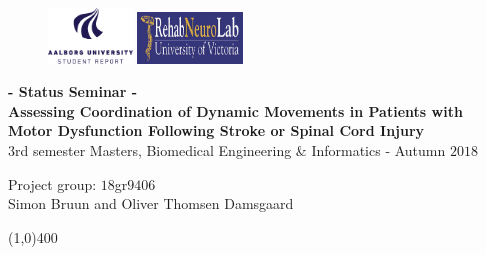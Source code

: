 \clearpage
\thispagestyle{empty}

\begin{figure}[H]
	\raggedleft
	\includegraphics[width=0.2\textwidth]{setup/aaulogo-en.png}
	\hspace{8.5cm}
	\includegraphics[width=0.25\textwidth]{setup/RNL.png}
\end{figure} 

\vspace{3 cm}

\begin{center}
	\begin{Huge}
		\textbf{- Status Seminar -}\\
		\vspace{2cm}
		\textbf{Assessing Coordination of Dynamic Movements in Patients with Motor Dysfunction Following Stroke or Spinal Cord Injury}\\
		\vspace{20 mm}
		3rd semester Masters, Biomedical Engineering \& Informatics - Autumn $2018$\\
		\vspace{3 mm}
	\end{Huge}
	{\Large Project group: $18$gr$9406$} \\
	\vspace{1cm}
	\large{Simon Bruun and Oliver Thomsen Damsgaard}
\end{center}
\vspace*{\fill}

\begin{center}
	\line(1,0){400}
\end{center}

